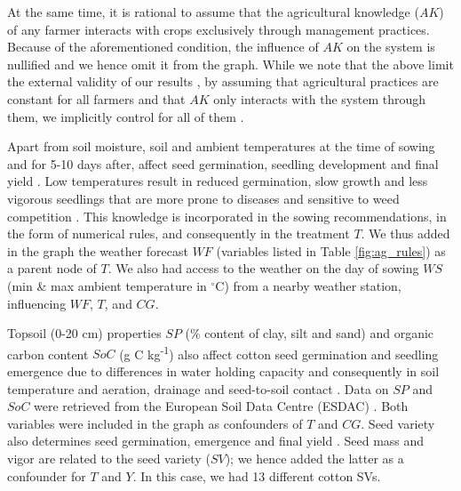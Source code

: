 \documentclass[letterpaper]{article} %
\begin{document}
At the same time, it is rational to assume that the agricultural knowledge ($AK$) of any farmer interacts with crops exclusively through management practices. Because of the aforementioned condition, the influence of $AK$ on the system is nullified and we hence omit it from the graph. While we note that the above limit the external validity of our results \cite{calder1982concept}, by assuming that agricultural practices are constant for all farmers and that $AK$ only interacts with the system through them, we implicitly control for all of them \cite{huntington2021effect}.


Apart from soil moisture, soil and ambient temperatures at the time of sowing and for 5-10 days after, affect seed germination, seedling development and final yield \cite{virk2019physiological,boman2005soil,varcosoil}.
Low temperatures result in reduced germination, slow growth and less vigorous 
seedlings that are more prone to diseases and sensitive to weed competition \cite{wanjura1969emergence,bradow2010germination}. This knowledge is incorporated in the sowing recommendations, in the form of numerical rules, and consequently in the treatment $T$. We thus added in the graph the weather forecast $WF$ (variables listed in Table \ref{fig:ag_rules}) as a parent node of $T$. We also had access to the weather on the day of sowing $WS$ (min \& max ambient temperature in $^\circ$C) from a nearby weather station, influencing $WF$, $T$, and $CG$.
 

Topsoil (0-20 cm) properties $SP$ (\% content of clay, silt and sand) and organic carbon content  $SoC$ (g C kg\textsuperscript{-1}) also affect cotton seed germination and seedling emergence due to differences in water holding capacity and consequently in soil temperature and aeration, drainage and seed-to-soil contact \cite{varcosoil}. Data on $SP$ and $SoC$ were retrieved from the European Soil Data Centre (ESDAC) \cite{ballabio2016mapping, de2015map}. Both variables were included in the graph as confounders of $T$ and $CG$.
Seed variety also determines seed germination, emergence and final yield \cite{sniderseed}.
Seed mass and vigor \cite{liu2015early,sniderseed} are related to the seed variety ($SV$); we hence added the latter as a confounder for $T$ and $Y$. In this case, we had 13 different cotton SVs.
\end{document}

